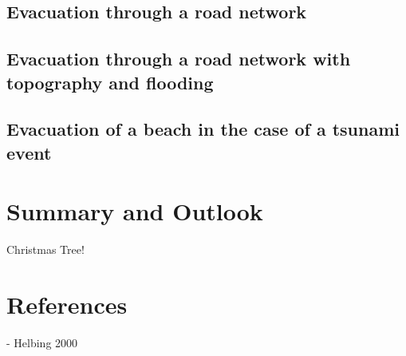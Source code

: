 \documentclass[11pt]{article}
\begin{document}
\subsection{Evacuation through a road network}
\subsection{Evacuation through a road network with topography and flooding}
\subsection{Evacuation of a beach in the case of a tsunami event}

\section{Summary and Outlook}

Christmas Tree!

\section{References}

- Helbing 2000
\end{document}
